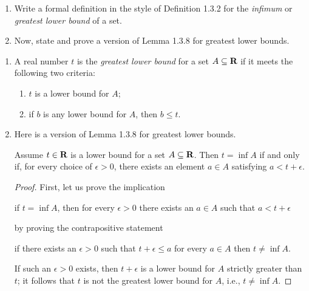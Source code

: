 \documentclass{lew98_solutions}
\begin{document}
\begin{exercise}
\label{ex:1.3.1}
    \begin{enumerate}
        \item Write a formal definition in the style of Definition 1.3.2 for the \textit{infimum} or \textit{greatest lower bound} of a set.

        \item Now, state and prove a version of Lemma 1.3.8 for greatest lower bounds.
    \end{enumerate}
\end{exercise}

\begin{solution}
    \begin{enumerate}
        \item A real number \( t \) is the \textit{greatest lower bound} for a set \( A \subseteq \mathbf{R} \) if it meets the following two criteria:
        \begin{enumerate}[label = (\roman*)]
            \item \( t \) is a lower bound for \( A \);

            \item if \( b \) is any lower bound for \( A \), then \( b \leq t \).
        \end{enumerate}

        \item Here is a version of Lemma 1.3.8 for greatest lower bounds.
        \begin{lemma}
        \label{lem:ex1.3.1}
            Assume \( t \in \mathbf{R} \) is a lower bound for a set \( A \subseteq \mathbf{R} \). Then \( t = \inf A \) if and only if, for every choice of \( \epsilon > 0 \), there exists an element \( a \in A \) satisfying \( a < t + \epsilon \).
        \end{lemma}

        \begin{proof}
            First, let us prove the implication
            \begin{center}
                if \( t = \inf A \), then for every \( \epsilon > 0 \) there exists an \( a \in A \) such that \( a < t + \epsilon \)
            \end{center}
            by proving the contrapositive statement
            \begin{center}
                if there exists an \( \epsilon > 0 \) such that \( t + \epsilon \leq a \) for every \( a \in A \) then \( t \neq \inf A \).
            \end{center}
            If such an \( \epsilon > 0 \) exists, then \( t + \epsilon \) is a lower bound for \( A \) strictly greater than \( t \); it follows that \( t \) is not the greatest lower bound for \( A \), i.e., \( t \neq \inf A \).


\end{proof}
\end{enumerate}
\end{solution}
\end{document}
